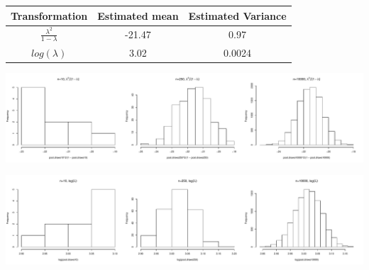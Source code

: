 \documentclass[12pt]{article}\usepackage[]{graphicx}\usepackage[]{color}
\newenvironment{knitrout}{}{} %
\begin{document}
\begin{doublespacing}
\begin{enumerate}
\begin{table}[H]
\centering
\begin{tabular}{c|c|c}
Transformation & Estimated mean & Estimated Variance \\
\hline
$\frac{\lambda^2}{1-\lambda}$ & -21.47 & 0.97 \\
$log(\lambda)$ & 3.02 & 0.0024 \\
\hline
\end{tabular}
\end{table}

\begin{knitrout}\footnotesize
{}\color{fgcolor}
\includegraphics[width=\linewidth]{figure/codetransform-1} 

\includegraphics[width=\linewidth]{figure/codetransform-2} 

\end{knitrout}


\end{enumerate}
\end{doublespacing}
\end{document}
